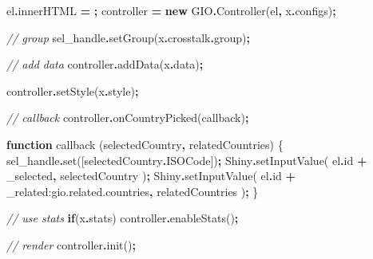 \documentclass[
]{krantz}
\makeatletter
\newenvironment{Shaded}{\begin{snugshade}}{\end{snugshade}}
\newcommand{\AttributeTok}[1]{\textcolor[rgb]{0.61,0.61,0.61}{#1}}
\newcommand{\CommentTok}[1]{\textcolor[rgb]{0.37,0.37,0.37}{\textit{#1}}}
\newcommand{\ControlFlowTok}[1]{\textcolor[rgb]{0.27,0.27,0.27}{\textbf{#1}}}
\newcommand{\FunctionTok}[1]{\textcolor[rgb]{0,0,0}{#1}}
\newcommand{\KeywordTok}[1]{\textcolor[rgb]{0.27,0.27,0.27}{\textbf{#1}}}
\newcommand{\NormalTok}[1]{#1}
\newcommand{\OperatorTok}[1]{\textcolor[rgb]{0.43,0.43,0.43}{\textbf{#1}}}
\newcommand{\StringTok}[1]{\textcolor[rgb]{0.5,0.5,0.5}{#1}}
\newenvironment{kframe}{%
\medskip{}
\setlength{\fboxsep}{.8em}
 \def\at@end@of@kframe{}%
 \ifinner\ifhmode%
  \def\at@end@of@kframe{\end{minipage}}%
  \begin{minipage}{\columnwidth}%
 \fi\fi%
 \def\FrameCommand##1{\hskip\@totalleftmargin \hskip-\fboxsep
 \colorbox{shadecolor}{##1}\hskip-\fboxsep
     \hskip-\linewidth \hskip-\@totalleftmargin \hskip\columnwidth}%
 \MakeFramed {\advance\hsize-\width
   \@totalleftmargin\z@ \linewidth\hsize
   \@setminipage}}%
 {\par\unskip\endMakeFramed%
 \at@end@of@kframe}
\renewenvironment{Shaded}{\begin{kframe}}{\end{kframe}}
\makeatother
\begin{document}
\begin{Shaded}
\begin{Highlighting}[]
\NormalTok{        el}\OperatorTok{.}\AttributeTok{innerHTML} \OperatorTok{=} \StringTok{\textquotesingle{}\textquotesingle{}}\OperatorTok{;}
\NormalTok{        controller }\OperatorTok{=} \KeywordTok{new}\NormalTok{ GIO}\OperatorTok{.}\FunctionTok{Controller}\NormalTok{(el}\OperatorTok{,}\NormalTok{ x}\OperatorTok{.}\AttributeTok{configs}\NormalTok{)}\OperatorTok{;}

        \CommentTok{// group}
\NormalTok{        sel\_handle}\OperatorTok{.}\FunctionTok{setGroup}\NormalTok{(x}\OperatorTok{.}\AttributeTok{crosstalk}\OperatorTok{.}\AttributeTok{group}\NormalTok{)}\OperatorTok{;}
        
        \CommentTok{// add data}
\NormalTok{        controller}\OperatorTok{.}\FunctionTok{addData}\NormalTok{(x}\OperatorTok{.}\AttributeTok{data}\NormalTok{)}\OperatorTok{;}

\NormalTok{        controller}\OperatorTok{.}\FunctionTok{setStyle}\NormalTok{(x}\OperatorTok{.}\AttributeTok{style}\NormalTok{)}\OperatorTok{;}

        \CommentTok{// callback}
\NormalTok{        controller}\OperatorTok{.}\FunctionTok{onCountryPicked}\NormalTok{(callback)}\OperatorTok{;}

        \KeywordTok{function}\NormalTok{ callback (selectedCountry}\OperatorTok{,}\NormalTok{ relatedCountries) \{}
\NormalTok{          sel\_handle}\OperatorTok{.}\FunctionTok{set}\NormalTok{([selectedCountry}\OperatorTok{.}\AttributeTok{ISOCode}\NormalTok{])}\OperatorTok{;}
\NormalTok{          Shiny}\OperatorTok{.}\FunctionTok{setInputValue}\NormalTok{(}
\NormalTok{            el}\OperatorTok{.}\AttributeTok{id} \OperatorTok{+} \StringTok{\textquotesingle{}\_selected\textquotesingle{}}\OperatorTok{,} 
\NormalTok{            selectedCountry}
\NormalTok{          )}\OperatorTok{;}
\NormalTok{          Shiny}\OperatorTok{.}\FunctionTok{setInputValue}\NormalTok{(}
\NormalTok{            el}\OperatorTok{.}\AttributeTok{id} \OperatorTok{+} \StringTok{\textquotesingle{}\_related:gio.related.countries\textquotesingle{}}\OperatorTok{,} 
\NormalTok{            relatedCountries}
\NormalTok{          )}\OperatorTok{;}
\NormalTok{        \}}

        \CommentTok{// use stats}
        \ControlFlowTok{if}\NormalTok{(x}\OperatorTok{.}\AttributeTok{stats}\NormalTok{)}
\NormalTok{          controller}\OperatorTok{.}\FunctionTok{enableStats}\NormalTok{()}\OperatorTok{;}

        \CommentTok{// render}
\NormalTok{        controller}\OperatorTok{.}\FunctionTok{init}\NormalTok{()}\OperatorTok{;}


\end{Highlighting}
\end{Shaded}
\end{document}
